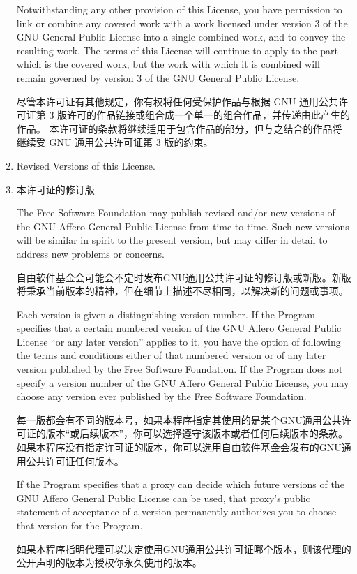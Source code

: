 \documentclass[11pt]{article}
\begin{document}
\begin{enumerate}
Notwithstanding any other provision of this License, you have permission to
link or combine any covered work with a work licensed under version 3 of
the GNU General Public License into a single combined work, and to convey
the resulting work.  The terms of this License will continue to apply to
the part which is the covered work, but the work with which it is combined
will remain governed by version 3 of the GNU General Public License.

尽管本许可证有其他规定，你有权将任何受保护作品与根据 GNU 通用公共许可证第 3 版许可的作品链接或组合成一个单一的组合作品，并传递由此产生的作品。 本许可证的条款将继续适用于包含作品的部分，但与之结合的作品将继续受 GNU 通用公共许可证第 3 版的约束。

\item Revised Versions of this License.
\item 本许可证的修订版

The Free Software Foundation may publish revised and/or new versions of
the GNU Affero General Public License from time to time.  Such new versions will
be similar in spirit to the present version, but may differ in detail to
address new problems or concerns.

自由软件基金会可能会不定时发布GNU通用公共许可证的修订版或新版。新版将秉承当前版本的精神，但在细节上描述不尽相同，以解决新的问题或事项。

Each version is given a distinguishing version number.  If the
Program specifies that a certain numbered version of the GNU Affero General
Public License ``or any later version'' applies to it, you have the
option of following the terms and conditions either of that numbered
version or of any later version published by the Free Software
Foundation.  If the Program does not specify a version number of the
GNU Affero General Public License, you may choose any version ever published
by the Free Software Foundation.

每一版都会有不同的版本号，如果本程序指定其使用的是某个GNU通用公共许可证的版本“或后续版本”，你可以选择遵守该版本或者任何后续版本的条款。如果本程序没有指定许可证的版本，你可以选用自由软件基金会发布的GNU通用公共许可证任何版本。

If the Program specifies that a proxy can decide which future
versions of the GNU Affero General Public License can be used, that proxy's
public statement of acceptance of a version permanently authorizes you
to choose that version for the Program.

如果本程序指明代理可以决定使用GNU通用公共许可证哪个版本，则该代理的公开声明的版本为授权你永久使用的版本。


\end{enumerate}
\end{document}
